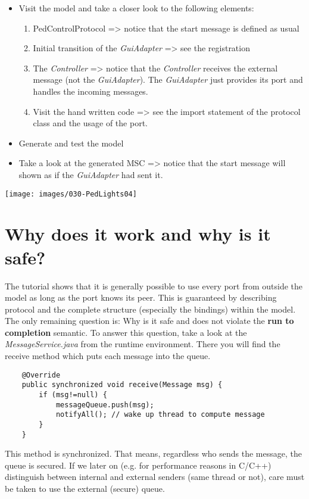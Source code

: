 \begin{itemize}
\item  Visit the model and take a closer look to the following elements:
\begin{enumerate}
\item PedControlProtocol => notice that the start message is defined as usual
\item Initial transition of the \textit{GuiAdapter} => see the registration
\item The \textit{Controller} => notice that the \textit{Controller} receives the external message (not the \textit{GuiAdapter}). The \textit{GuiAdapter} just provides its port and handles the incoming messages.
\item Visit the hand written code => see the import statement of the protocol class and the usage of the port.
\end{enumerate}
\item Generate and test the model
\item Take a look at the generated MSC => notice that the start message will shown as if the \textit{GuiAdapter} had sent it.
\end{itemize}

\texttt{[image: images/030-PedLights04]}

\section{Why does it work and why is it safe?}

The tutorial shows that it is generally possible to use every port from outside the model as long as the port knows its peer. This is guaranteed by describing protocol and the complete structure (especially the bindings) within the model. 
The only remaining question is: Why is it safe and does not violate the \textbf{run to completion} semantic. To answer this question, take a look at the \textit{MessageService.java} from the runtime environment. There you will find the receive method which puts each message into the queue. 

\begin{verbatim}
    @Override
    public synchronized void receive(Message msg) {
        if (msg!=null) {
            messageQueue.push(msg);
            notifyAll(); // wake up thread to compute message
        }
    }
\end{verbatim}

This method is synchronized. That means, regardless who sends the message, the queue is secured. If we later on (e.g. for performance reasons in C/C++) distinguish between internal and external senders (same thread or not), care must be taken to use the external (secure) queue.
